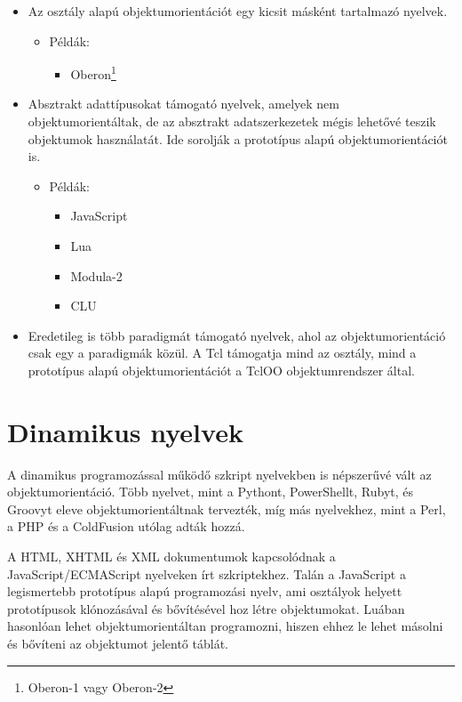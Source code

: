 \documentclass[a4paper,12pt,twoside]{report}
\theoremstyle{definition}
\begin{document}
\begin{itemize}
	\item Az osztály alapú objektumorientációt egy kicsit másként tartalmazó nyelvek. 
	\begin{itemize}
		\item Példák: 
		\begin{itemize}
			\item Oberon\footnote{Oberon-1 vagy Oberon-2}
		\end{itemize}
	\end{itemize}

	\item Absztrakt adattípusokat támogató nyelvek, amelyek nem objektumorientáltak, de az absztrakt adatszerkezetek mégis lehetővé teszik objektumok használatát. Ide sorolják a prototípus alapú objektumorientációt is. 
	\begin{itemize}
		\item Példák:
		\begin{itemize}
			\item JavaScript
			\item Lua
			\item Modula-2
			\item CLU
		\end{itemize}
	\end{itemize} 

	\item Eredetileg is több paradigmát támogató nyelvek, ahol az objektumorientáció csak egy a paradigmák közül. A Tcl támogatja mind az osztály, mind a prototípus alapú objektumorientációt a TclOO objektumrendszer által.
	\end{itemize}

	\section{Dinamikus nyelvek}
	
	A dinamikus programozással működő szkript nyelvekben is népszerűvé vált az objektumorientáció. Több nyelvet, mint a Pythont, PowerShellt, Rubyt, és Groovyt eleve objektumorientáltnak tervezték, míg más nyelvekhez, mint a Perl, a PHP és a ColdFusion utólag adták hozzá.
	
	A HTML, XHTML és XML dokumentumok kapcsolódnak a JavaScript/ECMAScript nyelveken írt szkriptekhez. Talán a JavaScript a legismertebb prototípus alapú programozási nyelv, ami osztályok helyett prototípusok klónozásával és bővítésével hoz létre objektumokat. Luában hasonlóan lehet objektumorientáltan programozni, hiszen ehhez le lehet másolni és bővíteni az objektumot jelentő táblát.
	
\end{document}
